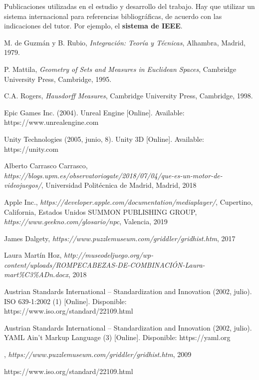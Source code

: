 \begin{thebibliography}{99}
 Publicaciones utilizadas en el estudio y desarrollo del trabajo.
Hay que utilizar un sistema internacional para referencias bibliográficas, de acuerdo con las indicaciones del tutor. Por ejemplo, el \textbf{sistema de IEEE}.

 M. de Guzmán y B. Rubio, \textit{Integración: Teoría y Técnicas}, Alhambra, Madrid, 1979.

 P. Mattila, \textit{Geometry of Sets and Measures in Euclidean Spaces}, Cambridge University Press, Cambridge, 1995.

 C.A. Rogers, \textit{Hausdorff Measures}, Cambridge University Press, Cambridge, 1998.

 Epic Games Inc. (2004). Unreal Engine [Online]. Available: https://www.unrealengine.com

 Unity Technologies (2005, junio, 8). Unity 3D [Online]. Available: https://unity.com

 Alberto Carrasco Carrasco, \textit{https://blogs.upm.es/observatoriogate/2018/07/04/que-es-un-motor-de-videojuegos/}, Universidad Politécnica de Madrid, Madrid, 2018

 Apple Inc., \textit{https://developer.apple.com/documentation/mediaplayer/}, Cupertino, California, Estados Unidos
 SUMMON PUBLISHING GROUP, \textit{https://www.geekno.com/glosario/npc}, Valencia, 2019

 James Dalgety, \textit{https://www.puzzlemuseum.com/griddler/gridhist.htm}, 2017

 Laura Martín Hoz, \textit{http://museodeljuego.org/wp-content/uploads/ROMPECABEZAS-DE-COMBINACIÓN-Laura-mart\%C3\%ADn.docx}, 2018

 Austrian Standards International – Standardization and Innovation (2002, julio). ISO 639-1:2002 (1) [Online]. Disponible: https://www.iso.org/standard/22109.html

 Austrian Standards International – Standardization and Innovation (2002, julio). YAML Ain’t Markup Language (3) [Online]. Disponible: https://yaml.org

 , \textit{https://www.puzzlemuseum.com/griddler/gridhist.htm}, 2009

https://www.iso.org/standard/22109.html

\end{thebibliography}

